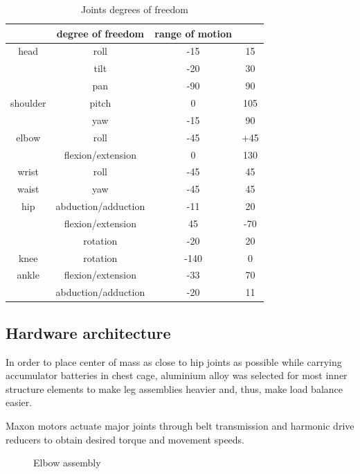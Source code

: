 \documentclass[letterpaper, 10 pt, conference]{ieeeconf}  %
\begin{document}
\begin{table}[thpb]
    \caption{Joints degrees of freedom}
    \label{tbl:DOFTable}
    \begin{center}
    \begin{tabular}{c | c c c}
        & degree of freedom & range of motion & \\
    \hline
        head & roll & -15 & 15 \\
            & tilt & -20 & 30 \\
            & pan & -90 & 90 \\
    \hline
        shoulder &  pitch & 0 & 105\\
                & yaw & -15 & 90\\
    \hline
        elbow & roll & -45 & +45 \\
                & flexion/extension & 0 & 130\\ 
    \hline
        wrist & roll & -45 & 45 \\
    \hline
        waist & yaw & -45 & 45 \\
    \hline
        hip & abduction/adduction & -11 & 20 \\
            & flexion/extension & 45 & -70 \\
            & rotation &-20 & 20\\
    \hline
        knee & rotation & -140 & 0 \\
    \hline
        ankle & flexion/extension & -33 & 70 \\
            & abduction/adduction & -20 & 11\\
    \end{tabular}
    \end{center}
\end{table}

\subsection{Hardware architecture}
In order to place center of mass as close to hip joints as possible while
carrying accumulator batteries in chest cage, aluminium alloy was selected for
most inner structure elements to make leg assemblies heavier and, thus, make
load balance easier.

Maxon motors actuate major joints through belt transmission and harmonic drive
reducers to obtain desired torque and movement speeds.

\begin{figure}[thpb]
\centering
{}
\caption{Elbow assembly}
\label{img:joints}
\end{figure}
\end{document}
